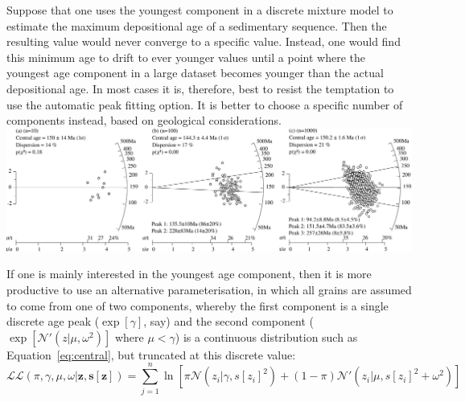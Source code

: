 \begin{refsection}
Suppose that one uses the youngest component in a discrete mixture
model to estimate the maximum depositional age of a sedimentary
sequence. Then the resulting value would never converge to a specific
value.  Instead, one would find this minimum age to drift to ever
younger values until a point where the youngest age component in a
large dataset becomes younger than the actual depositional age. In
most cases it is, therefore, best to resist the temptation to use the
automatic peak fitting option. It is better to choose a specific
number of components instead, based on geological considerations.\\

\noindent\includegraphics[width=\textwidth]{../figures/increasingn.pdf}
\begingroup {}
\label{fig:increasingn}
\endgroup

If one is mainly interested in the youngest age component, then it is
more productive to use an alternative parameterisation, in which all
grains are assumed to come from one of two components, whereby the
first component is a single discrete age peak ($\exp[\gamma]$, say)
and the second component ($\exp[\mathcal{N}'(z|\mu,\omega^2)]$ where
$\mu<\gamma$) is a continuous distribution such as
Equation~\ref{eq:central}, but truncated at this discrete value:
\begin{equation}
  \mathcal{LL}(\pi,\gamma,\mu,\omega|\mathbf{z},\mathbf{s[z]}) =
  \sum\limits_{j=1}^{n} \ln\!\left[
    \pi \mathcal{N}(z_i|\gamma,s[z_i]^2) +
    (1-\pi) \mathcal{N}'(z_i|\mu,s[z_i]^2+\omega^2)
    \right]
\label{eq:Lminagemod}
\end{equation}


\end{refsection}
